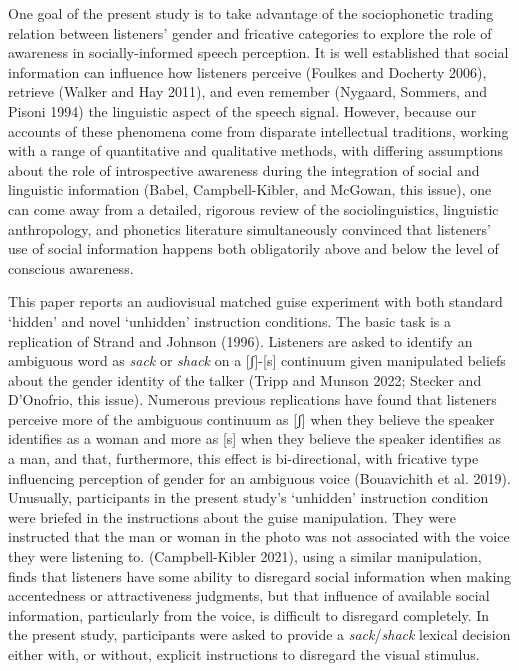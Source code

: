 \documentclass[
  letterpaper,
  DIV=11,
  numbers=noendperiod]{scrartcl}
\begin{document}
One goal of the present study is to take advantage of the sociophonetic
trading relation between listeners' gender and fricative categories to
explore the role of awareness in socially-informed speech perception. It
is well established that social information can influence how listeners
perceive (Foulkes and Docherty 2006), retrieve (Walker and Hay 2011),
and even remember (Nygaard, Sommers, and Pisoni 1994) the linguistic
aspect of the speech signal. However, because our accounts of these
phenomena come from disparate intellectual traditions, working with a
range of quantitative and qualitative methods, with differing
assumptions about the role of introspective awareness during the
integration of social and linguistic information (Babel,
Campbell-Kibler, and McGowan, this issue), one can come away from a
detailed, rigorous review of the sociolinguistics, linguistic
anthropology, and phonetics literature simultaneously convinced that
listeners' use of social information happens both obligatorily above and
below the level of conscious awareness.

This paper reports an audiovisual matched guise experiment with both
standard `hidden' and novel `unhidden' instruction conditions. The basic
task is a replication of Strand and Johnson (1996). Listeners are asked
to identify an ambiguous word as \emph{sack} or \emph{shack} on a
{[}ʃ{]}-{[}s{]} continuum given manipulated beliefs about the gender
identity of the talker (Tripp and Munson 2022; Stecker and D'Onofrio,
this issue). Numerous previous replications have found that listeners
perceive more of the ambiguous continuum as {[}ʃ{]} when they believe
the speaker identifies as a woman and more as {[}s{]} when they believe
the speaker identifies as a man, and that, furthermore, this effect is
bi-directional, with fricative type influencing perception of gender for
an ambiguous voice (Bouavichith et al. 2019). Unusually, participants in
the present study's `unhidden' instruction condition were briefed in the
instructions about the guise manipulation. They were instructed that the
man or woman in the photo was not associated with the voice they were
listening to. (Campbell-Kibler 2021), using a similar manipulation,
finds that listeners have some ability to disregard social information
when making accentedness or attractiveness judgments, but that influence
of available social information, particularly from the voice, is
difficult to disregard completely. In the present study, participants
were asked to provide a \emph{sack}/\emph{shack} lexical decision either
with, or without, explicit instructions to disregard the visual
stimulus.
\end{document}
